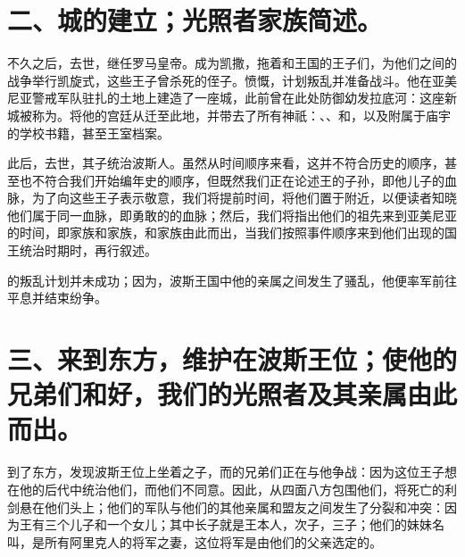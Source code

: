 \section{二、城的建立；光照者家族简述。}

不久之后，去世，继任罗马皇帝。成为凯撒，拖着和王国的王子们，为他们之间的战争举行凯旋式，这些王子曾杀死的侄子。愤慨，计划叛乱并准备战斗。他在亚美尼亚警戒军队驻扎的土地上建造了一座城，此前曾在此处防御幼发拉底河：这座新城被称为。将他的宫廷从迁至此地，并带去了所有神祇：、、和，以及附属于庙宇的学校书籍，甚至王室档案。\par

此后，去世，其子统治波斯人。虽然从时间顺序来看，这并不符合历史的顺序，甚至也不符合我们开始编年史的顺序，但既然我们正在论述王的子孙，即他儿子的血脉，为了向这些王子表示敬意，我们将提前时间，将他们置于附近，以便读者知晓他们属于同一血脉，即勇敢的的血脉；然后，我们将指出他们的祖先来到亚美尼亚的时间，即家族和家族，和家族由此而出，当我们按照事件顺序来到他们出现的国王统治时期时，再行叙述。\par

的叛乱计划并未成功；因为，波斯王国中他的亲属之间发生了骚乱，他便率军前往平息并结束纷争。\par


\section{三、来到东方，维护在波斯王位；使他的兄弟们和好，我们的光照者及其亲属由此而出。}

到了东方，发现波斯王位上坐着之子，而的兄弟们正在与他争战：因为这位王子想在他的后代中统治他们，而他们不同意。因此，从四面八方包围他们，将死亡的利剑悬在他们头上；他们的军队与他们的其他亲属和盟友之间发生了分裂和冲突：因为王有三个儿子和一个女儿；其中长子就是王本人，次子，三子；他们的妹妹名叫，是所有阿里克人的将军之妻，这位将军是由他们的父亲选定的。\par

